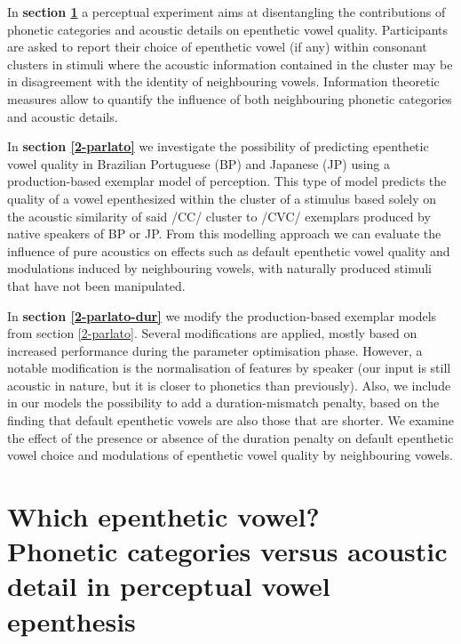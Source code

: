 In \textbf{section \ref{2-ahpa}} a perceptual experiment aims at disentangling the contributions of phonetic categories and acoustic details on epenthetic vowel quality. Participants are asked to report their choice of epenthetic vowel (if any) within consonant clusters in stimuli where the acoustic information contained in the cluster may be in disagreement with the identity of neighbouring vowels. Information theoretic measures allow to quantify the influence of both neighbouring phonetic categories and acoustic details.

In \textbf{section \ref{2-parlato}} we investigate the possibility of predicting epenthetic vowel quality in Brazilian Portuguese (BP) and Japanese (JP) using a production-based exemplar model of perception. This type of model predicts the quality of a vowel epenthesized within the cluster of a stimulus based solely on the acoustic similarity of said /CC/ cluster to /CVC/ exemplars produced by native speakers of BP or JP. From this modelling approach we can evaluate the influence of pure acoustics on effects such as default epenthetic vowel quality and modulations induced by neighbouring vowels, with naturally produced stimuli that have not been manipulated.

In \textbf{section \ref{2-parlato-dur}} we modify the production-based exemplar models from section \ref{2-parlato}. Several modifications are applied, mostly based on increased performance during the parameter optimisation phase. However, a notable modification is the normalisation of features by speaker (our input is still acoustic in nature, but it is closer to phonetics than previously). Also, we include in our models the possibility to add a duration-mismatch penalty, based on the finding that default epenthetic vowels are also those that are shorter. We examine the effect of the presence or absence of the duration penalty on default epenthetic vowel choice and modulations of epenthetic vowel quality by neighbouring vowels.   


\section{Which epenthetic vowel? \\ Phonetic categories versus acoustic detail in perceptual vowel epenthesis} \label{2-ahpa}

